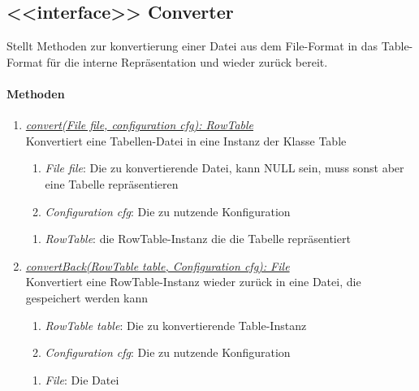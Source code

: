 \subsection{<{<{interface}>}> Converter}
Stellt Methoden zur konvertierung einer Datei aus dem File-Format in das Table-Format für die interne Repräsentation und wieder zurück bereit. \\

\paragraph{Methoden}
\begin{enumerate}[+]
	\item \underline{\textit{convert(File file, configuration cfg): RowTable}} \\
	Konvertiert eine Tabellen-Datei in eine Instanz der Klasse Table
	
	\begin{enumerate}[$\bullet$]
		\item \textit{File file}: Die zu konvertierende Datei, kann NULL sein, muss sonst aber eine Tabelle repräsentieren
		\item \textit{Configuration cfg}: Die zu nutzende Konfiguration
	\end{enumerate}
	\vspace{-0.2cm}
	\begin{enumerate}[$\circ$]
		\item \textit{RowTable}: die RowTable-Instanz die die Tabelle repräsentiert
	\end{enumerate}

	\item \underline{\textit{convertBack(RowTable table, Configuration cfg): File}} \\
	Konvertiert eine RowTable-Instanz wieder zurück in eine Datei, die gespeichert werden kann
	\begin{enumerate}[$\bullet$]
		\item \textit{RowTable table}: Die zu konvertierende Table-Instanz
		\item \textit{Configuration cfg}: Die zu nutzende Konfiguration
	\end{enumerate}
	\vspace{-0.2cm}
	\begin{enumerate}[$\circ$]
		\item \textit{File}: Die Datei
	\end{enumerate}
\end{enumerate}